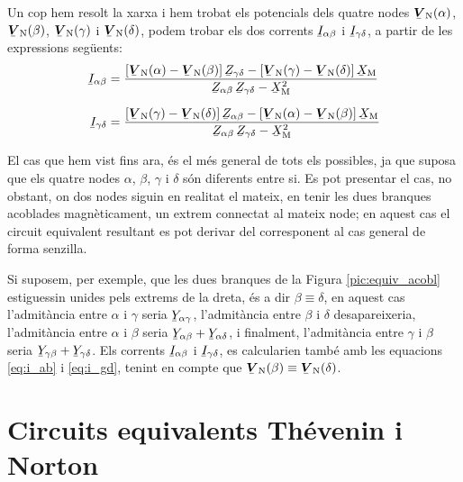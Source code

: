 Un cop hem resolt la xarxa i hem trobat els potencials
dels quatre nodes $\mcmplx{V}\ped{N}(\alpha)$,
$\mcmplx{V}\ped{N}(\beta)$, $\mcmplx{V}\ped{N}(\gamma)$ i
$\mcmplx{V}\ped{N}(\delta)$, podem trobar els dos corrents $\cmplx{I}_{\alpha\beta}$
i $\cmplx{I}_{\gamma\delta}$, a partir de les expressions seg\"{u}ents:
\begin{subequations}
\begin{align}
    \cmplx{I}_{\alpha\beta} &=  \frac{[\mcmplx{V}\ped{N}(\alpha) - \mcmplx{V}\ped{N}(\beta)] \, \cmplx{Z}_{\gamma\delta} - [\mcmplx{V}\ped{N}(\gamma) - \mcmplx{V}\ped{N}(\delta)] \,
    \cmplx{X}\ped{M}}{\cmplx{Z}_{\alpha\beta}\,
    \cmplx{Z}_{\gamma\delta}-\cmplx{X}\ped{M}^2} \label{eq:i_ab}
    \\[1.5ex]
    \cmplx{I}_{\gamma\delta} &= \frac{[\mcmplx{V}\ped{N}(\gamma) - \mcmplx{V}\ped{N}(\delta)] \, \cmplx{Z}_{\alpha\beta} - [\mcmplx{V}\ped{N}(\alpha) - \mcmplx{V}\ped{N}(\beta)] \,
    \cmplx{X}\ped{M}}{\cmplx{Z}_{\alpha\beta}\,
    \cmplx{Z}_{\gamma\delta}-\cmplx{X}\ped{M}^2} \label{eq:i_gd}
\end{align}
\end{subequations}

El cas que hem vist fins ara, \'{e}s el m\'{e}s general de tots els
possibles, ja que suposa que els quatre nodes $\alpha$, $\beta$,
$\gamma$ i $\delta$ s\'{o}n diferents entre si. Es pot presentar el cas,
no obstant, on dos nodes siguin en realitat el mateix, en tenir les
dues branques acoblades magn\`{e}ticament, un extrem connectat al mateix
node; en aquest cas el circuit equivalent resultant es pot derivar
del corresponent al cas general de forma senzilla.

Si suposem, per exemple, que les dues branques de la Figura
\vref{pic:equiv_acobl} estiguessin unides pels extrems de la dreta,
\'{e}s a dir $\beta\equiv\delta$, en aquest cas l'admit\`{a}ncia entre
$\alpha$ i $\gamma$ seria $\cmplx{Y}_{\alpha\gamma}$, l'admit\`{a}ncia
entre $\beta$ i $\delta$ desapareixeria, l'admit\`{a}ncia entre $\alpha$
i $\beta$ seria $\cmplx{Y}_{\alpha\beta} +
\cmplx{Y}_{\alpha\delta}$, i finalment, l'admit\`{a}ncia entre $\gamma$
i $\beta$ seria $\cmplx{Y}_{\gamma\beta} +
\cmplx{Y}_{\gamma\delta}$. Els corrents $\cmplx{I}_{\alpha\beta}$ i
$\cmplx{I}_{\gamma\delta}$, es calcularien tamb\'{e} amb les equacions
\eqref{eq:i_ab} i \eqref{eq:i_gd}, tenint en compte que
$\mcmplx{V}\ped{N}(\beta)\equiv\mcmplx{V}\ped{N}(\delta)$.

\section{Circuits equivalents Th\'{e}venin i Norton}   

